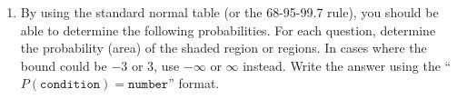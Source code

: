 \documentclass[12pt,letterpaper]{article}
\begin{document}
\newpage
\begin{enumerate}[resume]
\item By using the standard normal table (or the 68-95-99.7 rule), you should be able to determine the following probabilities. For each question, determine the probability (area) of the shaded region or regions. In cases where the bound could be $-3$ or $3$, use $-\infty$ or $\infty$ instead.  Write the answer using the ``$P(\texttt{condition}) = \texttt{number}$'' format.

\begin{enumerate}[itemsep=50pt]
\end{enumerate}
\end{enumerate}
\end{document}
